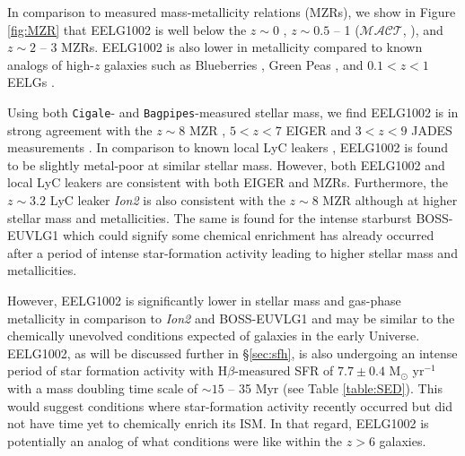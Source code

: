 \documentclass[twocolumn,tight,times,linenumbers]{aastex631}
\newcommand{\hbeta}{H$\beta$}
\newcommand{\cigale}{\texttt{Cigale}}
\newcommand{\bagpipes}{\texttt{Bagpipes}}
\begin{document}
        In comparison to measured mass-metallicity relations (MZRs), we show in Figure \ref{fig:MZR} that EELG1002 is well below the $z \sim 0$ \citep{Andrews2013}, $z \sim 0.5$ -- 1 ($\mathcal{MACT}$, \citealt{Ly2016}), and $z \sim 2$ -- 3 \citep{Sanders2021} MZRs. EELG1002 is also lower in metallicity compared to known analogs of high-$z$ galaxies such as Blueberries \citep{Yang2017_BB}, Green Peas \citep{Yang2017_GP}, and $0.1 < z < 1$ EELGs \citep{Amorin2015}.
		
		Using both \cigale- and \bagpipes-measured stellar mass, we find EELG1002 is in strong agreement with the $z\sim8$ MZR \citep{Langeroodi2023}, $5 < z < 7$ EIGER \citep{Matthee2023} and $3 < z < 9$ JADES measurements \citep{Boyett2024}. In comparison to known local LyC leakers \citep{Izotov2016,Izotov2018}, EELG1002 is found to be slightly metal-poor at similar stellar mass. However, both EELG1002 and local LyC leakers are consistent with both EIGER and \citet{Langeroodi2023} MZRs. Furthermore, the $z \sim 3.2$ LyC leaker \textit{Ion2} is also consistent with the $z \sim 8$ MZR although at higher stellar mass and metallicities. The same is found for the intense starburst BOSS-EUVLG1 \citep{Marques-Chaves2020} which could signify some chemical enrichment has already occurred after a period of intense star-formation activity leading to higher stellar mass and metallicities.
		
		However, EELG1002 is significantly lower in stellar mass and gas-phase metallicity in comparison to \textit{Ion2} and BOSS-EUVLG1 and may be similar to the chemically unevolved conditions expected of galaxies in the early Universe. EELG1002, as will be discussed further in \S\ref{sec:sfh}, is also undergoing an intense period of star formation activity with \hbeta-measured SFR of $7.7\pm0.4$ M$_\odot$ yr$^{-1}$ with a mass doubling time scale of $\sim 15$ -- 35 Myr (see Table \ref{table:SED}). This would suggest conditions where star-formation activity recently occurred but did not have time yet to chemically enrich its ISM. In that regard, EELG1002 is potentially an analog of what conditions were like within the $z > 6$ galaxies.
\end{document}
